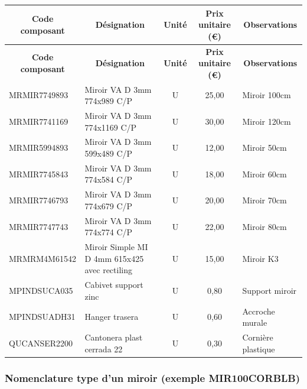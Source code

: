 \documentclass[12pt,a4paper]{article}
\begin{document}
\begin{longtable}{|p{4cm}|p{7cm}|c|c|p{2cm}|}
\hline
\multicolumn{1}{|c|}{\textbf{Code composant}} & \multicolumn{1}{c|}{\textbf{Désignation}} & \multicolumn{1}{c|}{\textbf{Unité}} & \multicolumn{1}{c|}{\textbf{Prix unitaire (€)}} & \multicolumn{1}{c|}{\textbf{Observations}} \\
\hline
\endfirsthead
\hline
\multicolumn{1}{|c|}{\textbf{Code composant}} & \multicolumn{1}{c|}{\textbf{Désignation}} & \multicolumn{1}{c|}{\textbf{Unité}} & \multicolumn{1}{c|}{\textbf{Prix unitaire (€)}} & \multicolumn{1}{c|}{\textbf{Observations}} \\
\hline
\endhead
\hline
\endfoot
MRMIR7749893 & Miroir VA D 3mm 774x989 C/P & U & 25,00 & Miroir 100cm \\
MRMIR7741169 & Miroir VA D 3mm 774x1169 C/P & U & 30,00 & Miroir 120cm \\
MRMIR5994893 & Miroir VA D 3mm 599x489 C/P & U & 12,00 & Miroir 50cm \\
MRMIR7745843 & Miroir VA D 3mm 774x584 C/P & U & 18,00 & Miroir 60cm \\
MRMIR7746793 & Miroir VA D 3mm 774x679 C/P & U & 20,00 & Miroir 70cm \\
MRMIR7747743 & Miroir VA D 3mm 774x774 C/P & U & 22,00 & Miroir 80cm \\
MRMRM4M61542 & Miroir Simple MI D 4mm 615x425 avec rectiling & U & 15,00 & Miroir K3 \\
MPINDSUCA035 & Cabivet support zinc & U & 0,80 & Support miroir \\
MPINDSUADH31 & Hanger trasera & U & 0,60 & Accroche murale \\
QUCANSER2200 & Cantonera plast cerrada 22 & U & 0,30 & Cornière plastique \\
\hline
\end{longtable}

\subsubsection{Nomenclature type d'un miroir (exemple MIR100CORBLB)}
\end{document}
